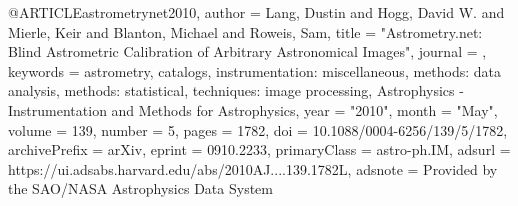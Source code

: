 
@ARTICLE{astrometrynet2010,
       author = {{Lang}, Dustin and {Hogg}, David W. and {Mierle}, Keir and
         {Blanton}, Michael and {Roweis}, Sam},
        title = "{Astrometry.net: Blind Astrometric Calibration of Arbitrary Astronomical Images}",
      journal = {\aj},
     keywords = {astrometry, catalogs, instrumentation: miscellaneous, methods: data analysis, methods: statistical, techniques: image processing, Astrophysics - Instrumentation and Methods for Astrophysics},
         year = "2010",
        month = "May",
       volume = {139},
       number = {5},
        pages = {1782},
          doi = {10.1088/0004-6256/139/5/1782},
archivePrefix = {arXiv},
       eprint = {0910.2233},
 primaryClass = {astro-ph.IM},
       adsurl = {https://ui.adsabs.harvard.edu/abs/2010AJ....139.1782L},
      adsnote = {Provided by the SAO/NASA Astrophysics Data System}
}
